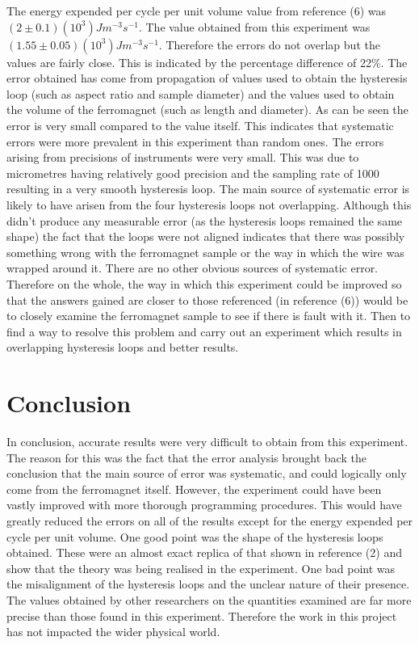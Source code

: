 \documentclass[a4paper]{article}\usepackage[english]{babel}
\begin{document}
The energy expended per cycle per unit volume value from reference (6) was $(2±0.1)(10^3)Jm^{-3}s^{-1}$. The value obtained from this experiment was $(1.55±0.05)(10^3)Jm^{-3}s^{-1}$. Therefore the errors do not overlap but the values are fairly close. This is indicated by the percentage difference of 22\%. The error obtained has come from propagation of values used to obtain the hysteresis loop (such as aspect ratio and sample diameter) and the values used to obtain the volume of the ferromagnet (such as length and diameter). As can be seen the error is very small compared to the value itself. This indicates that systematic errors were more prevalent in this experiment than random ones. The errors arising from precisions of instruments were very small. This was due to micrometres having relatively good precision and the sampling rate of 1000 resulting in a very smooth hysteresis loop. The main source of systematic error is likely to have arisen from the four hysteresis loops not overlapping. Although this didn’t produce any measurable error (as the hysteresis loops remained the same shape) the fact that the loops were not aligned indicates that there was possibly something wrong with the ferromagnet sample or the way in which the wire was wrapped around it. There are no other obvious sources of systematic error. Therefore on the whole, the way in which this experiment could be improved so that the answers gained are closer to those referenced (in reference (6)) would be to closely examine the ferromagnet sample to see if there is fault with it. Then to find a way to resolve this problem and carry out an experiment which results in overlapping hysteresis loops and better results.

\section{Conclusion}
In conclusion, accurate results were very difficult to obtain from this experiment. The reason for this was the fact that the error analysis brought back the conclusion that the main source of error was systematic, and could logically only come from the ferromagnet itself. However, the experiment could have been vastly improved with more thorough programming procedures. This would have greatly reduced the errors on all of the results except for the energy expended per cycle per unit volume.
One good point was the shape of the hysteresis loops obtained. These were an almost exact replica of that shown in reference (2) and show that the theory was being realised in the experiment. One bad point was the misalignment of the hysteresis loops and the unclear nature of their presence. 
The values obtained by other researchers on the quantities examined are far more precise than those found in this experiment. Therefore the work in this project has not impacted the wider physical world.
\end{document}
